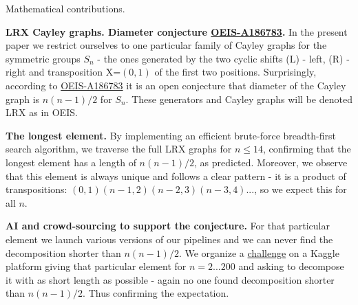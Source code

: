 \documentclass[atmp]{ipart_v1}
\numberwithin{equation}{section}
\theoremstyle{plain}%
\begin{document}
Mathematical contributions. %

{\bf LRX Cayley graphs. Diameter conjecture \href{https://oeis.org/A186783}{OEIS-A186783}.} In the present paper we restrict ourselves to one particular family of Cayley graphs for the symmetric groups $S_n$ - the ones generated by the two cyclic shifts (L) - left, (R) - right and transposition X=$(0,1)$ of the first two positions. Surprisingly, according to \href{https://oeis.org/A186783}{OEIS-A186783} it is an open conjecture that diameter of the Cayley graph is $n(n-1)/2$ for $S_n$. These generators and Cayley graphs will be denoted LRX as in OEIS. 



{\bf The longest element.} 
By implementing an efficient brute-force breadth-first search algorithm, we traverse the full LRX graphs for $n\le 14$, confirming that the longest element has a length of $n(n-1)/2$, as predicted.  Moreover, we observe that this element is always unique and follows a clear pattern - it is a product of transpositions:  $(0,1)(n-1,2)(n-2,3)(n-3,4)...$,  so we expect this  for all $n$.  
 
{\bf AI and crowd-sourcing to support the conjecture.} For that particular element we launch various versions of our pipelines and we can never find the decomposition shorter than $n(n-1)/2$. We organize a \href{https://www.kaggle.com/competitions/lrx-oeis-a-186783-brainstorm-math-conjecture/overview}{challenge} on a Kaggle platform giving that particular element for $n=2...200$ and asking to decompose it with as short length as possible - again no one found decomposition shorter than $n(n-1)/2$. Thus confirming the expectation.
\end{document}
